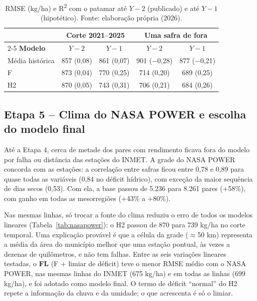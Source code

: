 \documentclass[12pt]{article}
\begin{document}
\begin{table}[ht]
\centering
\caption{RMSE (kg/ha) e R\textsuperscript{2} com o patamar até $Y-2$
  (publicado) e até $Y-1$ (hipotético). Fonte: elaboração própria (2026).}
\label{tab:defasagem}
\begin{tabular}{|p{3.6cm}|c|c|c|c|}
\hline
 & \multicolumn{2}{c|}{\textbf{Corte 2021--2025}} &
   \multicolumn{2}{c|}{\textbf{Uma safra de fora}} \\ \cline{2-5}
\textbf{Modelo} & \textbf{$Y-2$} & \textbf{$Y-1$} & \textbf{$Y-2$} &
  \textbf{$Y-1$} \\ \hline
Média histórica & 857 (0,08) & 861 (0,07) & 901 ($-$0,28) & 877 ($-$0,21) \\ \hline
F & 873 (0,04) & 770 (0,25) & 714 (0,20) & 689 (0,25) \\ \hline
H2 & 870 (0,05) & 743 (0,31) & 706 (0,21) & 684 (0,26) \\ \hline
\end{tabular}
\end{table}

\subsection{Etapa 5 -- Clima do NASA POWER e escolha do modelo final}

Até a Etapa 4, cerca de metade dos pares com rendimento ficava fora do
modelo por falha ou distância das estações do INMET. A grade do NASA
POWER concorda com as estações: a correlação entre safras ficou entre
0,78 e 0,89 para quase todas as variáveis (0,84 no déficit hídrico), com
exceção da maior sequência de dias secos (0,53). Com ela, a base passou
de 5.236 para 8.261 pares (+58\%), com ganho em todas as mesorregiões
(+43\% a +80\%).

Nas mesmas linhas, só trocar a fonte do clima reduziu o erro de todos os
modelos lineares (Tabela~\ref{tab:nasapower}): o H2 passou de 870 para
739 kg/ha no corte temporal. Uma explicação provável é que a célula da
grade ($\approx$50 km) representa a média da área do município melhor que
uma estação pontual, às vezes a dezenas de quilômetros, e não tem falhas.
Entre as seis variações lineares testadas, o \textbf{FL} (F + limiar de
déficit) teve o menor RMSE médio com o NASA POWER, nas mesmas linhas do
INMET (675 kg/ha) e em todas as linhas (699 kg/ha), e foi adotado como
modelo final. O termo de déficit ``normal'' do H2 repete a informação da
chuva e da umidade; o que acrescenta é só o limiar.
\end{document}

